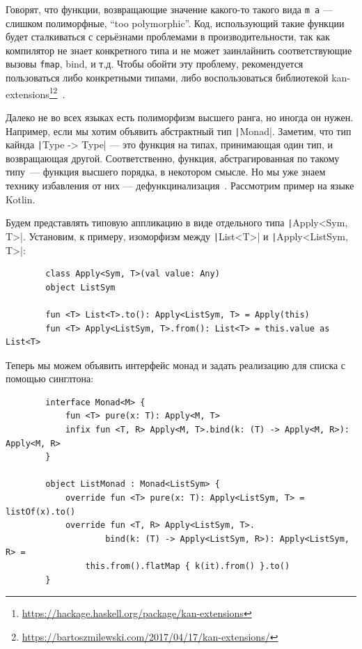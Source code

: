 \documentclass[12pt]{article}
\begin{document}
    Говорят, что функции, возвращающие значение какого-то такого вида \texttt{m a} --- слишком полиморфные, ``too polymorphic''.
    Код, использующий такие функции будет сталкиваться с серьёзнами проблемами в производительности, так как компилятор не знает конкретного типа и не может заинлайнить соответствующие вызовы \texttt{fmap}, bind, и т.д.
    Чтобы обойти эту проблему, рекомендуется пользоваться либо конкретными типами, либо воспользоваться библиотекой kan-extensions\footnote{\url{https://hackage.haskell.org/package/kan-extensions}}\footnote{\url{https://bartoszmilewski.com/2017/04/17/kan-extensions/}}~\cite[параграф 13.5]{maguire-types}.

    Далеко не во всех языках есть полиморфизм высшего ранга, но иногда он нужен.
    Например, если мы хотим объявить абстрактный тип \texttt|Monad|.
    Заметим, что тип кайнда \texttt|Type -> Type| --- это функция на типах, принимающая один тип, и возвращающая другой.
    Соответственно, функция, абстрагированная по такому типу~--- функция высшего порядка, в некотором смысле.
    Но мы уже знаем технику избавления от них --- дефункцинализация~\cite{defunctionalization-slides}.
    Рассмотрим пример на языке Kotlin.

    Будем представлять типовую аппликацию в виде отдельного типа \texttt|Apply<Sym, T>|.
    Установим, к примеру, изоморфизм между \texttt|List<T>| и \texttt|Apply<ListSym, T>|:
    \begin{verbatim}
        class Apply<Sym, T>(val value: Any)
        object ListSym

        fun <T> List<T>.to(): Apply<ListSym, T> = Apply(this)
        fun <T> Apply<ListSym, T>.from(): List<T> = this.value as List<T>
    \end{verbatim}

    Теперь мы можем объявить интерфейс монад и задать реализацию для списка с помощью синглтона:
    \begin{verbatim}
        interface Monad<M> {
            fun <T> pure(x: T): Apply<M, T>
            infix fun <T, R> Apply<M, T>.bind(k: (T) -> Apply<M, R>): Apply<M, R>
        }

        object ListMonad : Monad<ListSym> {
            override fun <T> pure(x: T): Apply<ListSym, T> = listOf(x).to()
            override fun <T, R> Apply<ListSym, T>.
                    bind(k: (T) -> Apply<ListSym, R>): Apply<ListSym, R> =
                this.from().flatMap { k(it).from() }.to()
        }
    \end{verbatim}
\end{document}
